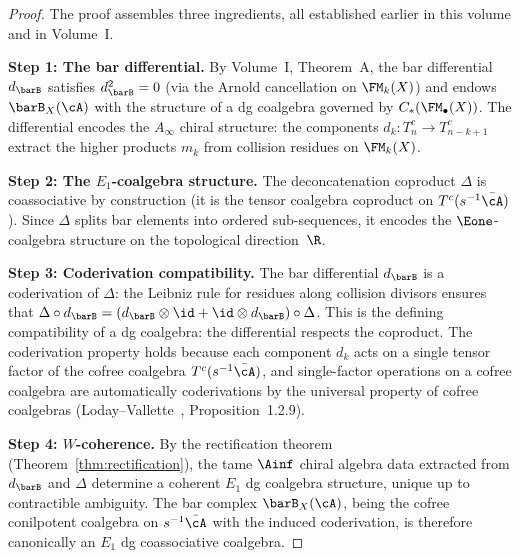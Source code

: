 \begin{proof}
The proof assembles three ingredients, all established earlier in
this volume and in Volume~I.

\medskip\noindent\textbf{Step 1: The bar differential.}
By Volume~I, Theorem~A, the bar differential $d_{\barB}$ satisfies
$d_{\barB}^2 = 0$ (via the Arnold cancellation on $\FM_k(X)$) and
endows $\barB_X(\cA)$ with the structure of a dg coalgebra
governed by $C_\ast(\FM_\bullet(X))$. The differential encodes
the $A_\infty$ chiral structure: the components
$d_k \colon T^c_n \to T^c_{n-k+1}$ extract the higher products
$m_k$ from collision residues on $\FM_k(X)$.

\medskip\noindent\textbf{Step 2: The $E_1$-coalgebra structure.}
The deconcatenation coproduct $\Delta$ is coassociative by
construction (it is the tensor coalgebra coproduct on
$T^c(s^{-1}\bar{\cA})$). Since $\Delta$ splits bar elements into
ordered sub-sequences, it encodes the $\Eone$-coalgebra structure
on the topological direction~$\R$.

\medskip\noindent\textbf{Step 3: Coderivation compatibility.}
The bar differential $d_{\barB}$ is a coderivation of $\Delta$:
the Leibniz rule for residues along collision divisors ensures that
$\Delta \circ d_{\barB}
= (d_{\barB} \otimes \id + \id \otimes d_{\barB}) \circ \Delta$.
This is the defining compatibility of a dg coalgebra: the
differential respects the coproduct.
The coderivation property holds because each component $d_k$
acts on a single tensor factor of the cofree coalgebra
$T^c(s^{-1}\bar{\cA})$, and single-factor operations on a cofree
coalgebra are automatically coderivations by the universal property
of cofree coalgebras (Loday--Vallette~\cite{LV12},
Proposition~1.2.9).

\medskip\noindent\textbf{Step 4: $W$-coherence.}
By the rectification theorem (Theorem~\ref{thm:rectification}),
the tame $\Ainf$ chiral algebra data extracted from $d_{\barB}$
and $\Delta$ determine a coherent $E_1$ dg coalgebra structure,
unique up to contractible ambiguity. The bar complex
$\barB_X(\cA)$, being the cofree conilpotent coalgebra on
$s^{-1}\bar{\cA}$ with the induced coderivation, is therefore
canonically an $E_1$ dg coassociative coalgebra.
\end{proof}

